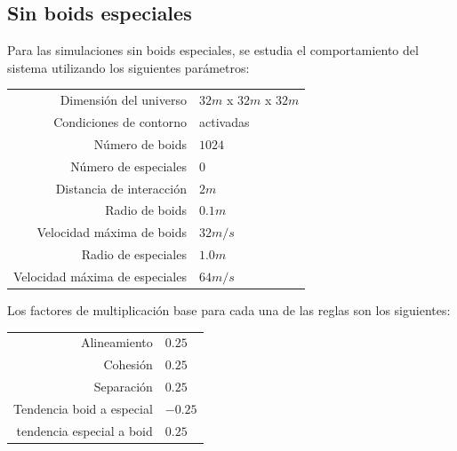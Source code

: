 \documentclass[a4paper]{article}
\begin{document}
        \subsection{Sin boids especiales}
            Para las simulaciones sin boids especiales, se estudia el comportamiento del sistema utilizando los siguientes parámetros:
                \begin{table}[h]
                    \centering
                    \begin{tabular}{|r|l|}
                        \hline
                        Dimensión del universo & $32m$ x $32m$ x $32m$ \\
                        Condiciones de contorno & activadas \\
                        Número de boids & $1024$ \\
                        Número de especiales & $0$ \\
                        Distancia de interacción & $2m$ \\
                        Radio de boids & $0.1m$ \\
                        Velocidad máxima de boids & $32 m/s$ \\
                        Radio de especiales & $1.0m$ \\
                        Velocidad máxima de especiales & $64 m/s$ \\
                        \hline
                    \end{tabular}
                \end{table}

            Los factores de multiplicación base para cada una de las reglas son los siguientes:

                \begin{table}[h]
                    \centering
                    \begin{tabular}{|r|l|}
                        \hline
                        Alineamiento & $0.25$ \\
                        Cohesión & $0.25$ \\
                        Separación & $0.25$ \\
                        Tendencia boid a especial & $-0.25$ \\
                        tendencia especial a boid & $0.25$ \\
                        \hline
                    \end{tabular}
                \end{table}
\end{document}
